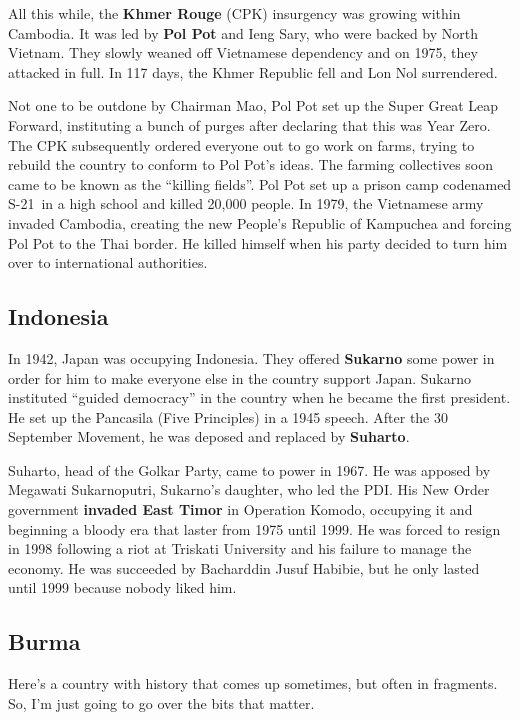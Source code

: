 All this while, the \textbf{Khmer Rouge} (CPK) insurgency was growing within Cambodia.
It was led by \textbf{Pol Pot} and Ieng Sary, who were backed by North Vietnam.
They slowly weaned off Vietnamese dependency and on 1975, they attacked in full.
In 117 days, the Khmer Republic fell and Lon Nol surrendered.

Not one to be outdone by Chairman Mao, Pol Pot set up the Super Great Leap Forward,
instituting a bunch of purges after declaring that this was Year Zero.
The CPK subsequently ordered everyone out to go work on farms,
trying to rebuild the country to conform to Pol Pot's ideas.
The farming collectives soon came to be known as the ``killing fields''.
Pol Pot set up a prison camp codenamed S-21\ in a high school and killed 20,000 people.
In 1979, the Vietnamese army invaded Cambodia,
creating the new People's Republic of Kampuchea and forcing Pol Pot to the Thai border.
He killed himself when his party decided to turn him over to international authorities.

\subsection*{Indonesia}

In 1942, Japan was occupying Indonesia.
They offered \textbf{Sukarno} some power in order for him to make everyone else in the country support Japan.
Sukarno instituted ``guided democracy'' in the country when he became the first president.
He set up the Pancasila (Five Principles) in a 1945 speech.
After the 30 September Movement, he was deposed and replaced by \textbf{Suharto}.

Suharto, head of the Golkar Party, came to power in 1967.
He was apposed by Megawati Sukarnoputri, Sukarno's daughter, who led the PDI\@.
His New Order government \textbf{invaded East Timor} in Operation Komodo,
occupying it and beginning a bloody era that laster from 1975 until 1999.
He was forced to resign in 1998 following a riot at Triskati University and his failure to manage the economy.
He was succeeded by Bacharddin Jusuf Habibie, but he only lasted until 1999 because nobody liked him.

\subsection*{Burma}

Here's a country with history that comes up sometimes, but often in fragments.
So, I'm just going to go over the bits that matter.

